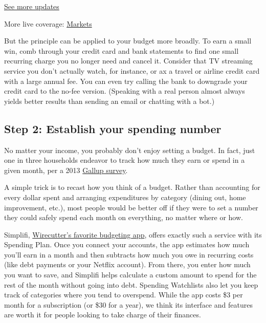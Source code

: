 \href{https://www.nytimes3xbfgragh.onion/2020/08/04/world/coronavirus-cases.html?action=click\&pgtype=Article\&state=default\&region=MAIN_CONTENT_1\&context=storylines_live_updates}{See
more updates}

More live coverage:
\href{https://www.nytimes3xbfgragh.onion/live/2020/08/04/business/stock-market-today-coronavirus?action=click\&pgtype=Article\&state=default\&region=MAIN_CONTENT_1\&context=storylines_live_updates}{Markets}

But the principle can be applied to your budget more broadly. To earn a
small win, comb through your credit card and bank statements to find one
small recurring charge you no longer need and cancel it. Consider that
TV streaming service you don't actually watch, for instance, or ax a
travel or airline credit card with a large annual fee. You can even try
calling the bank to downgrade your credit card to the no-fee version.
(Speaking with a real person almost always yields better results than
sending an email or chatting with a bot.)

\hypertarget{step-2-establish-your-spending-number}{%
\subsection{Step 2: Establish your spending
number}\label{step-2-establish-your-spending-number}}

No matter your income, you probably don't enjoy setting a budget. In
fact, just one in three households endeavor to track how much they earn
or spend in a given month, per a 2013
\href{https://news.gallup.com/poll/162872/one-three-americans-prepare-detailed-household-budget.aspx}{Gallup
survey}.

A simple trick is to recast how you think of a budget. Rather than
accounting for every dollar spent and arranging expenditures by category
(dining out, home improvement, etc.), most people would be better off if
they were to set a number they could safely spend each month on
everything, no matter where or how.

Simplifi,
\href{https://www.nytimes3xbfgragh.onion/wirecutter/money/best-budgeting-apps-and-tools/?utm_source=nytimes\&utm_medium=referral\&utm_campaign=wcsmarterliving\&utm_content=covid-budget}{Wirecutter's
favorite budgeting app}, offers exactly such a service with its Spending
Plan. Once you connect your accounts, the app estimates how much you'll
earn in a month and then subtracts how much you owe in recurring costs
(like debt payments or your Netflix account). From there, you enter how
much you want to save, and Simplifi helps calculate a custom amount to
spend for the rest of the month without going into debt. Spending
Watchlists also let you keep track of categories where you tend to
overspend. While the app costs \$3 per month for a subscription (or \$30
for a year), we think its interface and features are worth it for people
looking to take charge of their finances.

